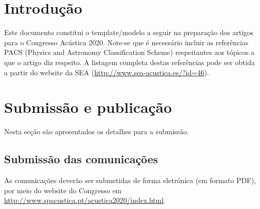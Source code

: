 \documentclass[11pt, a4paper, twoside]{article}
\begin{document}
 \setcounter{page}{1}

\section{Introdução}

Este documento constitui o template/modelo a seguir na preparação dos artigos para o Congresso Acústica 2020. Note-se que é necessário incluir as referências PACS (Physics and Astronomy Classification Scheme) respeitantes aos tópicos a que o artigo diz respeito. A listagem completa destas referências pode ser obtida a partir do website da SEA (\url{http://www.sea-acustica.es/?id=46}).


\section{Submissão e publicação}

Nesta seção são apresentados os detalhes para a submissão.

\subsection{Submissão das comunicações}

As comunicações deverão ser submetidas de forma eletrónica (em formato PDF), por meio do website do Congresso em \url{http://www.spacustica.pt/acustica2020/index.html}. 

\clearpage
\end{document}

